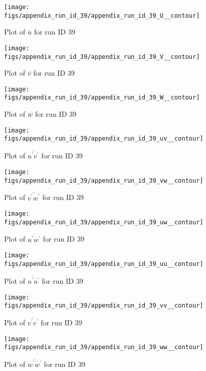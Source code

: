 \begin{figure}[H]
\centering
\texttt{[image: figs/appendix\_run\_id\_39/appendix\_run\_id\_39\_U\_\_contour]}
\caption{Plot of $\overline{u}$ for run ID 39}
\label{fig:appendix_run_id_39_U__contour}
\end{figure}


\begin{figure}[H]
\centering
\texttt{[image: figs/appendix\_run\_id\_39/appendix\_run\_id\_39\_V\_\_contour]}
\caption{Plot of $\overline{v}$ for run ID 39}
\label{fig:appendix_run_id_39_V__contour}
\end{figure}


\begin{figure}[H]
\centering
\texttt{[image: figs/appendix\_run\_id\_39/appendix\_run\_id\_39\_W\_\_contour]}
\caption{Plot of $\overline{w}$ for run ID 39}
\label{fig:appendix_run_id_39_W__contour}
\end{figure}


\begin{figure}[H]
\centering
\texttt{[image: figs/appendix\_run\_id\_39/appendix\_run\_id\_39\_uv\_\_contour]}
\caption{Plot of $\overline{u^\prime v^\prime}$ for run ID 39}
\label{fig:appendix_run_id_39_uv__contour}
\end{figure}


\begin{figure}[H]
\centering
\texttt{[image: figs/appendix\_run\_id\_39/appendix\_run\_id\_39\_vw\_\_contour]}
\caption{Plot of $\overline{v^\prime w^\prime}$ for run ID 39}
\label{fig:appendix_run_id_39_vw__contour}
\end{figure}


\begin{figure}[H]
\centering
\texttt{[image: figs/appendix\_run\_id\_39/appendix\_run\_id\_39\_uw\_\_contour]}
\caption{Plot of $\overline{u^\prime w^\prime}$ for run ID 39}
\label{fig:appendix_run_id_39_uw__contour}
\end{figure}


\begin{figure}[H]
\centering
\texttt{[image: figs/appendix\_run\_id\_39/appendix\_run\_id\_39\_uu\_\_contour]}
\caption{Plot of $\overline{u^\prime u^\prime}$ for run ID 39}
\label{fig:appendix_run_id_39_uu__contour}
\end{figure}


\begin{figure}[H]
\centering
\texttt{[image: figs/appendix\_run\_id\_39/appendix\_run\_id\_39\_vv\_\_contour]}
\caption{Plot of $\overline{v^\prime v^\prime}$ for run ID 39}
\label{fig:appendix_run_id_39_vv__contour}
\end{figure}


\begin{figure}[H]
\centering
\texttt{[image: figs/appendix\_run\_id\_39/appendix\_run\_id\_39\_ww\_\_contour]}
\caption{Plot of $\overline{w^\prime w^\prime}$ for run ID 39}
\label{fig:appendix_run_id_39_ww__contour}
\end{figure}


